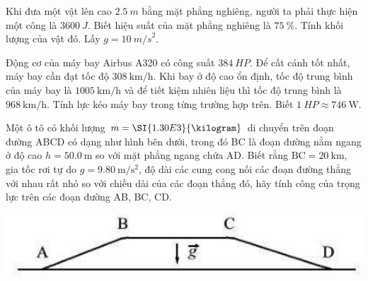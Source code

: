 \begin{ex}
	Khi đưa một vật lên cao $\SI{2,5}{m}$ bằng mặt phẳng nghiêng, người ta phải thực hiện một công là $\SI{3600}{J}$. Biết hiệu suất của mặt phẳng nghiêng là $\SI{75}{\percent}$. Tính khối lượng của vật đó. Lấy $g = \SI{10}{m/s}^2$.	
\end{ex}
\begin{ex}
	Động cơ của máy bay Airbus A320 có công suất $\SI{384}{HP}$. Để cất cánh tốt nhất, máy bay cần đạt tốc độ $\SI{308}{\kilo\meter/\hour}$. Khi bay ở độ cao ổn định, tốc độ trung bình của máy bay là $\SI{1005}{\kilo\meter/\hour}$ và để tiết kiệm nhiên liệu thì tốc độ trung bình là $\SI{968}{\kilo\meter/\hour}$. Tính lực kéo máy bay trong từng trường hợp trên. Biết $\SI{1}{HP} \approx \SI{746}{\watt}$.
\end{ex}
\begin{ex}
	Một ô tô có khối lượng $m=\SI{1.30E3}{\kilogram}$ di chuyển trên đoạn đường ABCD có dạng như hình bên dưới, trong đó BC là đoạn đường nằm ngang ở độ cao $h=\SI{50.0}{\meter}$ so với mặt phẳng ngang chứa AD. Biết rằng $\text{BC}=\SI{20}{\kilo\meter}$, gia tốc rơi tự do $g=\SI{9.80}{\meter/\second^2}$, độ dài các cung cong nối các đoạn đường thẳng với nhau rất nhỏ so với chiều dài của các đoạn thẳng đó, hãy tính công của trọng lực trên các đoạn đường AB, BC, CD.
	\begin{center}
		\includegraphics[scale=0.5]{../figs/VN10-2023-PH-TP024-P-7}
	\end{center}
\end{ex}

